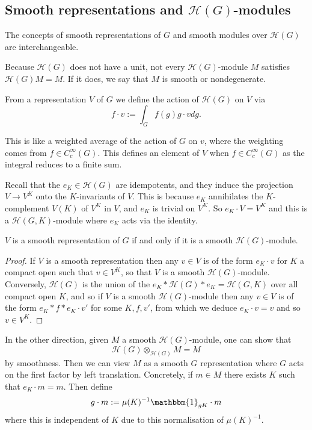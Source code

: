\subsection{Smooth representations and $\mathcal H(G)$-modules}

The concepts of smooth representations of $G$ and smooth modules over $\mathcal H(G)$ are interchangeable.

Because $\mathcal H(G)$ does not have a unit, not every $\mathcal H(G)$-module $M$ satisfies $\mathcal H(G) M = M$. If it does, we say that $M$ is smooth or nondegenerate.

\begin{defn}
From a representation $V$ of $G$ we define the action of $\mathcal H(G)$ on $V$ via 
$$f \cdot v := \int_G f(g) g \cdot v dg.$$
\end{defn}
This is like a weighted average of the action of $G$ on $v$, where the weighting comes from $f \in C_c^\infty(G)$. This defines an element of $V$ when $f \in C_c^\infty(G)$ as the integral reduces to a finite sum.


Recall that the $e_K \in \mathcal H(G)$ are idempotents, and they induce the projection $V \to V^K$ onto the $K$-invariants of $V$. This is because $e_K$ annihilates the $K$-complement $V(K)$ of $V^K$ in $V$, and $e_K$ is trivial on $V^K$. So $e_K \cdot V=V^K$ and this is a $\mathcal H(G,K)$-module where $e_K$ acts via the identity.

\begin{prop}
    $V$ is a smooth representation of $G$ if and only if it is a smooth $\mathcal H(G)$-module.
\end{prop}
\begin{proof}
If $V$ is a smooth representation then any $v \in V$ is of the form $e_K \cdot v$ for $K$ a compact open such that $v \in V^K$, so that $V$ is a smooth $\mathcal H(G)$-module. Conversely, $\mathcal H(G)$ is the union of the $e_K* \mathcal H(G) *e_K = \mathcal H(G,K)$ over all compact open $K$, and so if $V$ is a smooth $\mathcal H(G)$-module then any $v \in V$ is of the form $e_K * f * e_K \cdot v'$ for some $K, f, v'$, from which we deduce $e_K \cdot v=v$ and so $v \in V^K$.
\end{proof}

In the other direction, given $M$ a smooth $\mathcal H(G)$-module, one can show that $$\mathcal H(G) \otimes_{\mathcal H(G)} M = M$$ by smoothness. Then we can view $M$ as a smooth $G$ representation where $G$ acts on the first factor by left translation. Concretely, if $m \in M$ there exists $K$ such that $e_K \cdot m = m$. Then define $$g \cdot m := \mu(K)^{-1} \mathbbm{1}_{gK} \cdot m$$ where this is independent of $K$ due to this normalisation of $\mu(K)^{-1}$.

